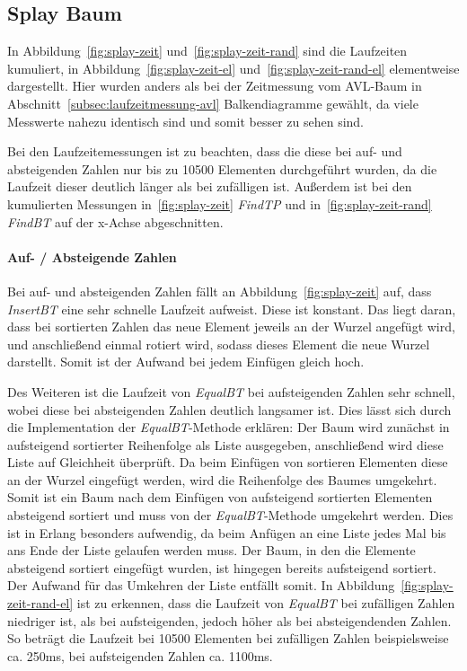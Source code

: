 \subsection{Splay Baum}
In Abbildung~\ref{fig:splay-zeit} und~\ref{fig:splay-zeit-rand} sind die Laufzeiten
kumuliert, in Abbildung~\ref{fig:splay-zeit-el} und~\ref{fig:splay-zeit-rand-el}
elementweise dargestellt.
Hier wurden anders als bei der Zeitmessung vom AVL-Baum in
Abschnitt~\ref{subsec:laufzeitmessung-avl} Balkendiagramme gewählt, da viele Messwerte nahezu
identisch sind und somit besser zu sehen sind.

Bei den Laufzeitemessungen ist zu beachten, dass die diese bei auf- und absteigenden
Zahlen nur bis zu 10500 Elementen durchgeführt wurden, da die Laufzeit dieser deutlich
länger als bei zufälligen ist.
Außerdem ist bei den kumulierten Messungen in~\ref{fig:splay-zeit} \textit{FindTP} und
in~\ref{fig:splay-zeit-rand} \textit{FindBT} auf der x-Achse abgeschnitten.

\paragraph{Auf- / Absteigende Zahlen}
Bei auf- und absteigenden Zahlen fällt an Abbildung~\ref{fig:splay-zeit} auf, dass \textit{InsertBT}
eine sehr schnelle Laufzeit aufweist.
Diese ist konstant.
Das liegt daran, dass bei sortierten Zahlen das neue Element jeweils an
der Wurzel angefügt wird, und anschließend einmal rotiert wird, sodass dieses Element die
neue Wurzel darstellt.
Somit ist der Aufwand bei jedem Einfügen gleich hoch.

Des Weiteren ist die Laufzeit von \textit{EqualBT} bei aufsteigenden Zahlen sehr schnell,
wobei diese bei absteigenden Zahlen deutlich langsamer ist.
Dies lässt sich durch die Implementation der \textit{EqualBT}-Methode erklären:
Der Baum wird zunächst in aufsteigend sortierter Reihenfolge als Liste ausgegeben,
anschließend wird diese Liste auf Gleichheit überprüft.
Da beim Einfügen von sortieren Elementen diese an der Wurzel eingefügt werden, wird die
Reihenfolge des Baumes umgekehrt.
Somit ist ein Baum nach dem Einfügen von aufsteigend sortierten Elementen absteigend sortiert
und muss von der \textit{EqualBT}-Methode umgekehrt werden.
Dies ist in Erlang besonders aufwendig, da beim Anfügen an eine Liste jedes Mal bis ans Ende
der Liste gelaufen werden muss.
Der Baum, in den die Elemente absteigend sortiert eingefügt wurden, ist hingegen bereits
aufsteigend sortiert.
Der Aufwand für das Umkehren der Liste entfällt somit.
In Abbildung~\ref{fig:splay-zeit-rand-el} ist zu erkennen, dass die
Laufzeit von \textit{EqualBT} bei zufälligen Zahlen niedriger ist,
als bei aufsteigenden, jedoch höher als bei absteigendenden Zahlen.
So beträgt die Laufzeit bei 10500 Elementen bei zufälligen Zahlen beispielsweise ca. 250ms,
bei aufsteigenden Zahlen ca. 1100ms.

